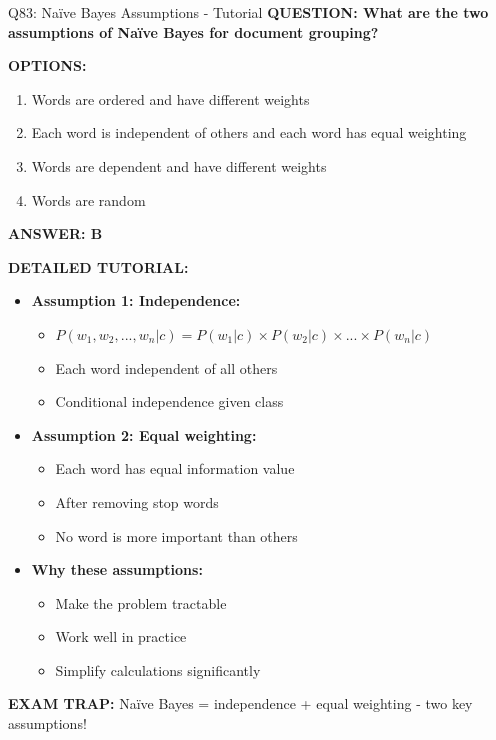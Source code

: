 \documentclass[8pt]{beamer}
\begin{document}
	\begin{frame}{Q83: Naïve Bayes Assumptions - Tutorial}
		\fontsize{6.5}{7.5}\selectfont
		\textbf{QUESTION: What are the two assumptions of Naïve Bayes for document grouping?}
		
		\vspace{0.1cm}
		\textbf{OPTIONS:}
		\begin{enumerate}
			\item Words are ordered and have different weights
			\item Each word is independent of others and each word has equal weighting
			\item Words are dependent and have different weights
			\item Words are random
		\end{enumerate}
		
		\vspace{0.1cm}
		\textcolor{myblue}{\textbf{ANSWER: B}}
		
		\vspace{0.1cm}
		\textbf{DETAILED TUTORIAL:}
		\begin{itemize}
			\item \textbf{Assumption 1: Independence:}
			\begin{itemize}
				\item $P(w_1, w_2, ..., w_n|c) = P(w_1|c) \times P(w_2|c) \times ... \times P(w_n|c)$
				\item Each word independent of all others
				\item Conditional independence given class
			\end{itemize}
			\item \textbf{Assumption 2: Equal weighting:}
			\begin{itemize}
				\item Each word has equal information value
				\item After removing stop words
				\item No word is more important than others
			\end{itemize}
			\item \textbf{Why these assumptions:}
			\begin{itemize}
				\item Make the problem tractable
				\item Work well in practice
				\item Simplify calculations significantly
			\end{itemize}
		\end{itemize}
		
		\textcolor{myred}{\textbf{EXAM TRAP:}} Naïve Bayes = \textcolor{myblue}{independence + equal weighting} - two key assumptions!
	\end{frame}
	
\end{document}
